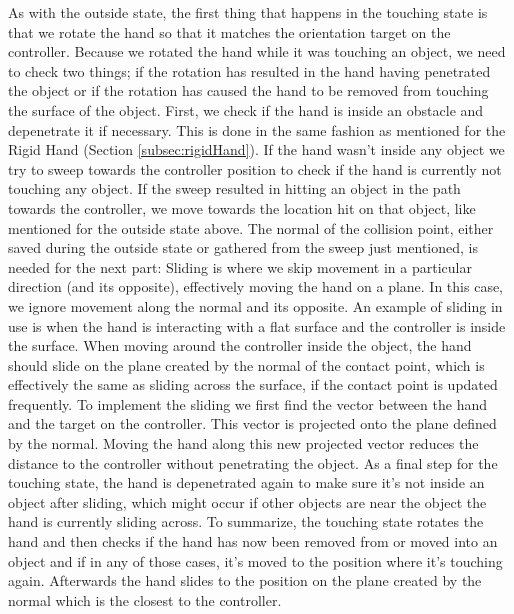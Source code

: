 As with the outside state, the first thing that happens in the touching state is that we rotate the hand so that it matches the orientation target on the controller. Because we rotated the hand while it was touching an object, we need to check two things; if the rotation has resulted in the hand having penetrated the object or if the rotation has caused the hand to be removed from touching the surface of the object. First, we check if the hand is inside an obstacle and depenetrate it if necessary. This is done in the same fashion as mentioned for the Rigid Hand (Section \ref{subsec:rigidHand}). If the hand wasn't inside any object we try to sweep towards the controller position to check if the hand is currently not touching any object. If the sweep resulted in hitting an object in the path towards the controller, we move towards the location hit on that object, like mentioned for the outside state above. The normal of the collision point, either saved during the outside state or gathered from the sweep just mentioned, is needed for the next part: Sliding is where we skip movement in a particular direction (and its opposite), effectively moving the hand on a plane. In this case, we ignore movement along the normal and its opposite. An example of sliding in use is when the hand is interacting with a flat surface and the controller is inside the surface. When moving around the controller inside the object, the hand should slide on the plane created by the normal of the contact point, which is effectively the same as sliding across the surface, if the contact point is updated frequently. To implement the sliding we first find the vector between the hand and the target on the controller. This vector is projected onto the plane defined by the normal. Moving the hand along this new projected vector reduces the distance to the controller without penetrating the object. As a final step for the touching state, the hand is depenetrated again to make sure it's not inside an object after sliding, which might occur if other objects are near the object the hand is currently sliding across. To summarize, the touching state rotates the hand and then checks if the hand has now been removed from or moved into an object and if in any of those cases, it's moved to the position where it's touching again. Afterwards the hand slides to the position on the plane created by the normal which is the closest to the controller.

